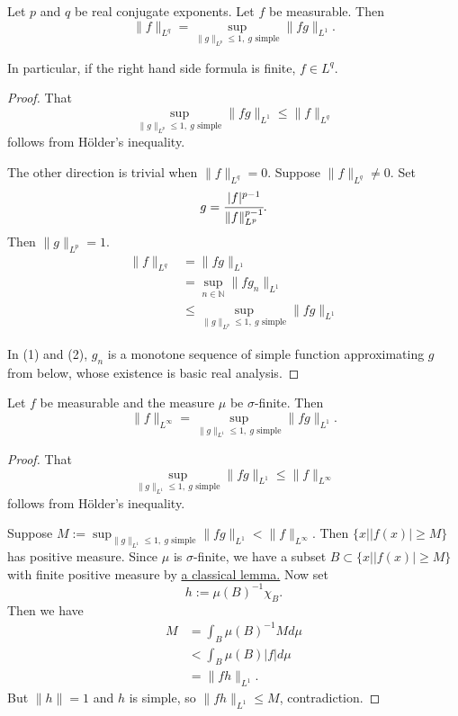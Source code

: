 \begin{lemma}
  \label{lem:snorm_eq_sSup_snorm}
  \leanok
  Let $p$ and $q$ be real conjugate exponents. Let $f$ be measurable. Then
  \[ \|f\|_{L^q} = \sup_{\|g\|_{L^p} \leq 1, \ g \text{ simple}} \| fg \|_{L^1}.\]

  In particular, if the right hand side formula is finite, $f\in L^q$.
  \end{lemma}
\begin{proof}
  \leanok %
  That $$\sup_{\|g\|_{L^p} \leq 1, \ g \text{ simple}} \| fg \|_{L^1} \le \|f\|_{L^q}$$
  follows from Hölder's inequality.

  The other direction is trivial when $\|f\|_{L^q}=0$. Suppose $\|f\|_{L^q}\ne 0$.
  Set $$g = \cfrac{|f|^{p-1}}{\|f\|_{L^p}^{p-1}}.$$
  Then $\|g\|_{L^p} = 1$.
  \begin{align*}
    \|f\|_{L^q} &= \| fg \|_{L^1} \\
    &= \sup_{n \in \mathbb N} \| fg_n \|_{L^1} \tag{1}\\
    &\le \sup_{\|g\|_{L^p} \leq 1, \ g \text{ simple}} \| fg \|_{L^1} \tag{2}
  \end{align*}

  In (1) and (2), $g_n$ is a monotone sequence of simple function approximating $g$ from below,
  whose existence is basic real analysis.
\end{proof}

\begin{lemma}
  \label{lem:snormEssSup_eq_sSup_snorm}
  \leanok
  Let $f$ be measurable and the measure $\mu$ be $\sigma$-finite. Then
  \[ \|f\|_{L^\infty} = \sup_{\|g\|_{L^1} \leq 1, \ g \text{ simple}} \| fg \|_{L^1}.\]
\end{lemma}

\begin{proof}
  \leanok
  That $$\sup_{\|g\|_{L^1} \leq 1, \ g \text{ simple}} \| fg \|_{L^1} \le \|f\|_{L^\infty}$$
  follows from Hölder's inequality.

  Suppose $M:= \sup_{\|g\|_{L^1} \leq 1, \ g \text{ simple}} \| fg \|_{L^1} < \|f\|_{L^\infty}$.
  Then $\{x | |f(x)| \ge M \}$ has positive measure. Since $\mu$ is $\sigma$-finite, we have a subset $B \subset \{x | |f(x)| \ge M \}$ with finite positive measure
  by \href{https://leanprover-community.github.io/mathlib4_docs/Mathlib/MeasureTheory/Measure/Typeclasses.html#MeasureTheory.Measure.exists_subset_measure_lt_top}{a classical lemma.} Now set
  $$h := \mu(B)^{-1} \chi_B.$$
  Then we have
  \begin{align*}
    M &= \int_B \mu (B)^{-1} M d\mu \\
    &< \int_B \mu (B) |f| d\mu \\
    &= \|fh\|_{L^1}.
  \end{align*}
  But $\|h\|=1$ and $h$ is simple, so $\|fh\|_{L^1} \le M$, contradiction.

\end{proof}





